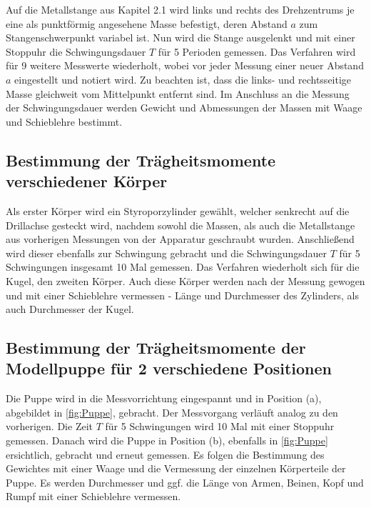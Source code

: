 Auf die Metallstange aus Kapitel 2.1 wird links und rechts des Drehzentrums je eine als punktförmig angesehene Masse befestigt, deren Abstand $a$ zum Stangenschwerpunkt variabel ist. Nun wird die Stange ausgelenkt und mit einer Stoppuhr die Schwingungsdauer $T$ für 5 Perioden gemessen. Das Verfahren wird für 9 weitere Messwerte wiederholt, wobei vor jeder Messung einer neuer Abstand $a$ eingestellt und notiert wird. Zu beachten ist, dass die links- und rechtsseitige Masse gleichweit vom Mittelpunkt entfernt sind. Im Anschluss an die Messung der Schwingungsdauer werden Gewicht und Abmessungen der Massen mit Waage und Schieblehre bestimmt.

\subsection{Bestimmung der Trägheitsmomente verschiedener Körper}

Als erster Körper wird ein Styroporzylinder gewählt, welcher senkrecht auf die Drillachse gesteckt wird, nachdem sowohl die Massen, als auch die Metallstange aus vorherigen Messungen von der Apparatur geschraubt wurden. Anschließend wird dieser ebenfalls zur Schwingung gebracht und die Schwingungsdauer $T$ für 5 Schwingungen insgesamt 10 Mal gemessen. Das Verfahren wiederholt sich für die Kugel, den zweiten Körper. Auch diese Körper werden nach der Messung gewogen und mit einer Schieblehre vermessen - Länge und Durchmesser des Zylinders, als auch Durchmesser der Kugel. 

\subsection{Bestimmung der Trägheitsmomente der Modellpuppe für 2 verschiedene Positionen}

Die Puppe wird in die Messvorrichtung eingespannt und in Position (a), abgebildet in \cref{fig:Puppe}, gebracht. Der Messvorgang verläuft analog zu den vorherigen. Die Zeit $T$ für 5 Schwingungen wird 10 Mal mit einer Stoppuhr gemessen. Danach wird die Puppe in Position (b), ebenfalls in \cref{fig:Puppe} ersichtlich, gebracht und erneut gemessen. Es folgen die Bestimmung des Gewichtes mit einer Waage und die Vermessung der einzelnen Körperteile der Puppe. Es werden Durchmesser und ggf. die Länge von Armen, Beinen, Kopf und Rumpf mit einer Schieblehre vermessen.

